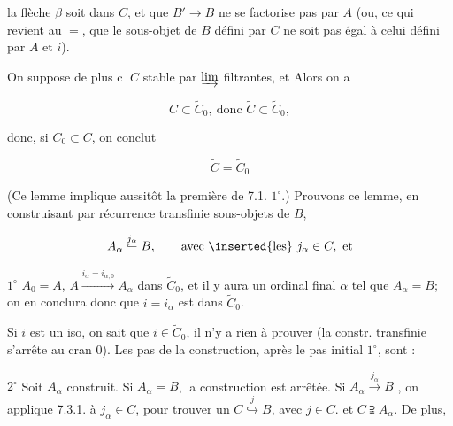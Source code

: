 la flèche $\beta$ soit dans $C$, et que $B'\longrightarrow B$ ne se factorise pas par $A$ (ou, ce qui revient au $=$, que le sous-objet de $B$ défini par $C$ ne soit pas égal à celui défini par $A$ et $i$).

On suppose de plus \textcircled{c} $C$ stable par $\varinjlim$ filtrantes, et
 Alors on a

\[
C\subset\widetilde C_0,\ \text{donc }\widetilde C\subset\widetilde C_0,\tag*{(7.3.2)}
\]

donc, si $C_0\subset C$, on conclut


\[
\widetilde C=\widetilde C_0\tag*{(7.3.3)}
\]

(Ce lemme implique aussitôt la première  de 7.1. $1^\circ$.) Prouvons ce lemme,   en construisant par récurrence transfinie    sous-objets de $B$,

\[
A_\alpha\overset{j_\alpha}{\lhook\joinrel\relbar} B,\qquad \text{avec \inserted{les} }j_\alpha\in C,\ \text{et}
\]

  \textcircled{$1^\circ$} $A_0=A$,   $A\xrightarrow{i_\alpha=i_{\alpha,0}}A_\alpha$ dans $\widetilde C_0$,  et  il y aura un ordinal final $\alpha$ tel que $A_\alpha=B$;  on en conclura donc que $i=i_\alpha$ est dans $\widetilde C_0$.

Si $i$ est un iso, on sait que $i\in\widetilde C_0$, il  n'y a rien à prouver (la constr. transfinie s'arrête au cran 0). Les   pas de la construction, après le pas initial $1^\circ$, sont :

\textcircled{$2^\circ$} Soit $A_\alpha$ construit. Si $A_\alpha=B$, la construction est arrêtée. Si $A_\alpha\xrightarrow{j_\alpha} B$ , on applique 7.3.1. à $j_\alpha\in C$, pour trouver un \deleted{\unsure{$-$}} $C\overset{j}{\hookrightarrow}B$, avec $j\in C$. et $C\supsetneqq A_\alpha$. De plus,

